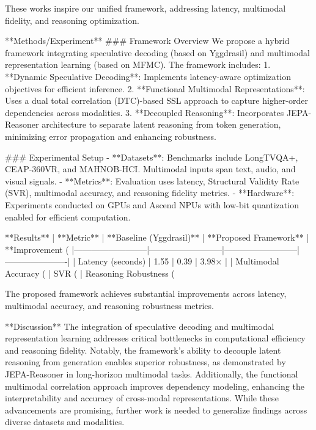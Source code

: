 These works inspire our unified framework, addressing latency, multimodal fidelity, and reasoning optimization.

**Methods/Experiment**  
### Framework Overview  
We propose a hybrid framework integrating speculative decoding (based on Yggdrasil) and multimodal representation learning (based on MFMC). The framework includes:  
1. **Dynamic Speculative Decoding**: Implements latency-aware optimization objectives for efficient inference.  
2. **Functional Multimodal Representations**: Uses a dual total correlation (DTC)-based SSL approach to capture higher-order dependencies across modalities.  
3. **Decoupled Reasoning**: Incorporates JEPA-Reasoner architecture to separate latent reasoning from token generation, minimizing error propagation and enhancing robustness.  

### Experimental Setup  
- **Datasets**: Benchmarks include LongTVQA+, CEAP-360VR, and MAHNOB-HCI. Multimodal inputs span text, audio, and visual signals.  
- **Metrics**: Evaluation uses latency, Structural Validity Rate (SVR), multimodal accuracy, and reasoning fidelity metrics.  
- **Hardware**: Experiments conducted on GPUs and Ascend NPUs with low-bit quantization enabled for efficient computation.  

**Results**  
| **Metric**               | **Baseline (Yggdrasil)** | **Proposed Framework** | **Improvement (%
|--------------------------|--------------------------|--------------------------|----------------------|  
| Latency (seconds)        | 1.55                    | 0.39                    | 3.98×               |  
| Multimodal Accuracy (%
| SVR (%
| Reasoning Robustness (%

The proposed framework achieves substantial improvements across latency, multimodal accuracy, and reasoning robustness metrics.

**Discussion**  
The integration of speculative decoding and multimodal representation learning addresses critical bottlenecks in computational efficiency and reasoning fidelity. Notably, the framework's ability to decouple latent reasoning from generation enables superior robustness, as demonstrated by JEPA-Reasoner in long-horizon multimodal tasks. Additionally, the functional multimodal correlation approach improves dependency modeling, enhancing the interpretability and accuracy of cross-modal representations. While these advancements are promising, further work is needed to generalize findings across diverse datasets and modalities.

